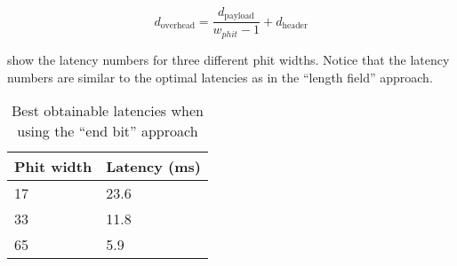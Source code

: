 \begin{equation}
    d_{\text{overhead}} = \frac{d_{\text{payload}}}{w_{phit} - 1} + d_{\text{header}}
\label{eq:end_bit_overhead}
\end{equation}

 show the latency numbers for three different phit widths.
Notice that the latency numbers are similar to the optimal latencies as in the ``length field'' approach. 

\begin{table}[hbtp]
\centering
\begin{tabular}{@{}ll@{}}
\toprule
\textbf{Phit width} & \textbf{Latency (ms)} \\ \midrule
17        & 23.6                  \\
33        & 11.8                  \\
65        & 5.9                   \\ \bottomrule
\end{tabular}
\caption{Best obtainable latencies when using the ``end bit'' approach}
\label{tab:end_bit_latency}
\end{table}
